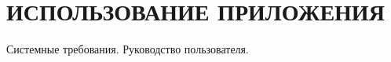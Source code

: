 \section[Использование приложения]{%
  ИСПОЛЬЗОВАНИЕ ПРИЛОЖЕНИЯ
}

\label{sec:usage}

Системные требования. Руководство пользователя.